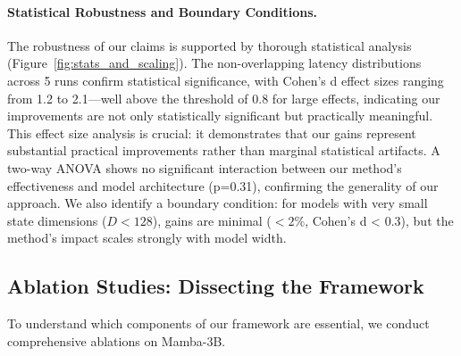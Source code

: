 \documentclass{article}
\begin{document}
\paragraph{Statistical Robustness and Boundary Conditions.}
The robustness of our claims is supported by thorough statistical analysis (Figure~\ref{fig:stats_and_scaling}). The non-overlapping latency distributions across 5 runs confirm statistical significance, with Cohen's d effect sizes ranging from 1.2 to 2.1—well above the threshold of 0.8 for large effects, indicating our improvements are not only statistically significant but practically meaningful. This effect size analysis is crucial: it demonstrates that our gains represent substantial practical improvements rather than marginal statistical artifacts. A two-way ANOVA shows no significant interaction between our method's effectiveness and model architecture (p=0.31), confirming the generality of our approach. We also identify a boundary condition: for models with very small state dimensions ($D < 128$), gains are minimal ($<2\%$, Cohen's d < 0.3), but the method's impact scales strongly with model width.

\subsection{Ablation Studies: Dissecting the Framework}

To understand which components of our framework are essential, we conduct 
comprehensive ablations on Mamba-3B.
\end{document}
